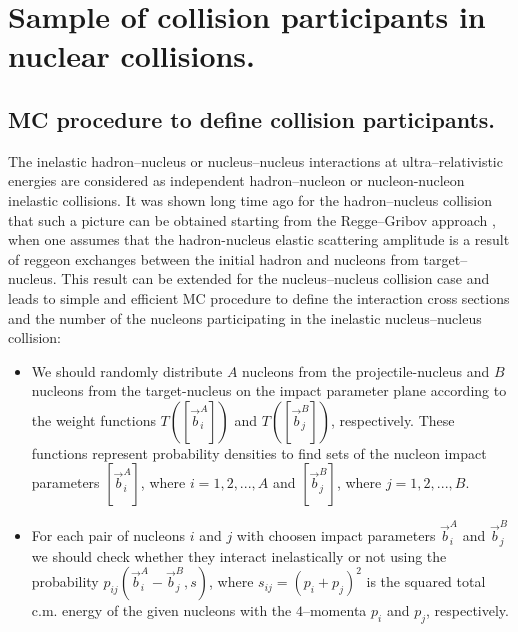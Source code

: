 \section{Sample of collision participants
in nuclear collisions.}

\subsection{MC procedure to define collision participants.}
\hspace{1.0em} The inelastic
hadron--nucleus or 
nucleus--nucleus interactions at ultra--relativistic energies are considered 
as
independent hadron--nucleon or 
nucleon-nucleon inelastic collisions.  It was shown long
time ago \cite{CK78} for the hadron--nucleus collision that such a
picture can be obtained starting from the Regge--Gribov
approach \cite{BT76}, when one assumes that the hadron-nucleus elastic
scattering amplitude is a result of reggeon exchanges between the
initial hadron and  nucleons from target--nucleus. This result can be
extended for the nucleus--nucleus collision case and leads to 
simple and efficient MC procedure \cite{Am86} to define
the interaction cross sections and the number of the nucleons
participating in the inelastic nucleus--nucleus collision:
\begin{itemize}
\item We should randomly distribute $A$ nucleons from the projectile-nucleus and $B$
nucleons from the target-nucleus on the impact parameter plane according
to the weight functions $T([\vec{b}^{A}_{i}])$ and
$T([\vec{b}^{B}_{j}])$, respectively. These functions represent
probability densities to find sets of the nucleon impact parameters
$[\vec{b}^{A}_{i}]$, where $i=1,2,...,A$ and $[\vec{b}^{B}_{j}]$, where
$j=1,2,...,B$.
\item For each pair of nucleons $i$ and $j$ with choosen impact parameters $\vec{b}^{A}_{i}$ and
$\vec{b}^{B}_{j}$ we should check whether they interact inelastically or
not using the probability $p_{ij}(\vec{b}^{A}_{i}-\vec{b}^{B}_{j},s)$,
where $s_{ij}=(p_{i}+p_{j})^2$ is the squared total c.m.  energy of the
given nucleons with the $4$--momenta $p_{i}$ and $p_{j}$, respectively.
\end{itemize}
 
